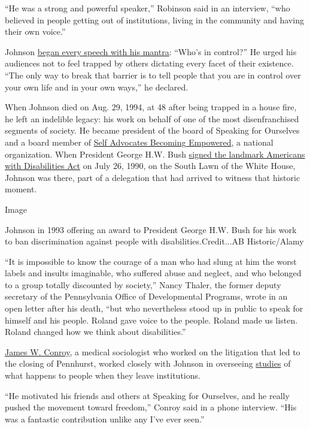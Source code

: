 ``He was a strong and powerful speaker,'' Robinson said in an interview,
``who believed in people getting out of institutions, living in the
community and having their own voice.''

Johnson \href{https://www.youtube.com/watch?v=zFI7u6V_GvA}{began every
speech with his mantra}: ``Who's in control?'' He urged his audiences
not to feel trapped by others dictating every facet of their existence.
``The only way to break that barrier is to tell people that you are in
control over your own life and in your own ways,'' he declared.

When Johnson died on Aug. 29, 1994, at 48 after being trapped in a house
fire, he left an indelible legacy: his work on behalf of one of the most
disenfranchised segments of society. He became president of the board of
Speaking for Ourselves and a board member of
\href{https://www.sabeusa.org/}{Self Advocates Becoming Empowered}, a
national organization. When President George H.W. Bush
\href{https://www.nytimes.com/interactive/2020/us/disability-ADA-30-anniversary.html}{signed
the landmark Americans with Disabilities Act} on July 26, 1990, on the
South Lawn of the White House, Johnson was there, part of a delegation
that had arrived to witness that historic moment.

Image

Johnson in 1993 offering an award to President George H.W. Bush for his
work to ban discrimination against people with disabilities.Credit...AB
Historic/Alamy

``It is impossible to know the courage of a man who had slung at him the
worst labels and insults imaginable, who suffered abuse and neglect, and
who belonged to a group totally discounted by society,'' Nancy Thaler,
the former deputy secretary of the Pennsylvania Office of Developmental
Programs, wrote in an open letter after his death, ``but who
nevertheless stood up in public to speak for himself and his people.
Roland gave voice to the people. Roland made us listen. Roland changed
how we think about disabilities.''

\href{http://www.eoutcome.org/default.aspx?pg=326}{James W. Conroy}, a
medical sociologist who worked on the litigation that led to the closing
of Pennhurst, worked closely with Johnson in overseeing
\href{https://aspe.hhs.gov/basic-report/pennhurst-longitudinal-study-combined-report-five-years-research-and-analysis}{studies}
of what happens to people when they leave institutions.

``He motivated his friends and others at Speaking for Ourselves, and he
really pushed the movement toward freedom,'' Conroy said in a phone
interview. ``His was a fantastic contribution unlike any I've ever
seen.''


